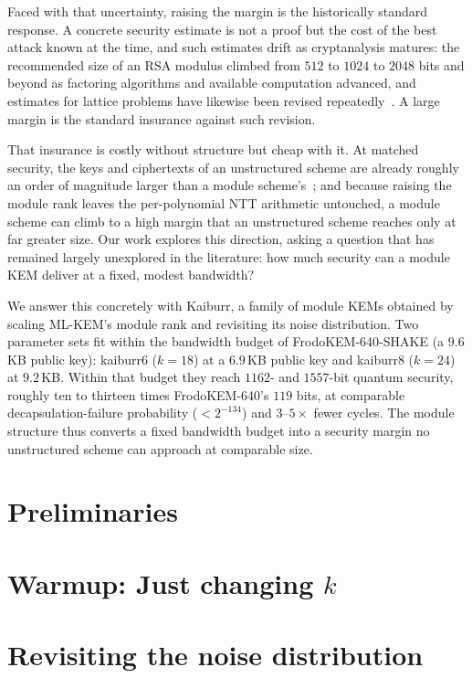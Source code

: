 \documentclass[a4paper,runningheads]{llncs}
\newcommand{\kyberk}{\ensuremath{k}\xspace}
\begin{document}
Faced with that uncertainty, raising the margin is the historically standard response.
A concrete security estimate is not a proof but the cost of the best attack known at the time, and such estimates drift as cryptanalysis matures: the recommended size of an RSA modulus climbed from $512$ to $1024$ to $2048$ bits and beyond as factoring algorithms and available computation advanced, and estimates for lattice problems have likewise been revised repeatedly~\cite{TODO-lattice-estimates}.
A large margin is the standard insurance against such revision.

That insurance is costly without structure but cheap with it.
At matched security, the keys and ciphertexts of an unstructured scheme are already roughly an order of magnitude larger than a module scheme's~\cite{TODO-frodo-ring}; and because raising the module rank leaves the per-polynomial NTT arithmetic untouched, a module scheme can climb to a high margin that an unstructured scheme reaches only at far greater size.
Our work explores this direction, asking a question that has remained largely unexplored in the literature: how much security can a module KEM deliver at a fixed, modest bandwidth?

We answer this concretely with \textsf{Kaiburr}, a family of module KEMs obtained by scaling ML-KEM's module rank and revisiting its noise distribution.
Two parameter sets fit within the bandwidth budget of FrodoKEM-640-SHAKE (a $9.6$\,KB public key): \textsf{kaiburr6} ($k=18$) at a $6.9$\,KB public key and \textsf{kaiburr8} ($k=24$) at $9.2$\,KB.
Within that budget they reach $1162$- and $1557$-bit quantum security, roughly ten to thirteen times FrodoKEM-640's $119$ bits, at comparable decapsulation-failure probability ($<2^{-134}$) and $3$--$5\times$ fewer cycles.
The module structure thus converts a fixed bandwidth budget into a security margin no unstructured scheme can approach at comparable size.



\section{Preliminaries}
\label{sec:preliminaries}

\section{Warmup: Just changing \kyberk}
\label{sec:warmup}

\section{Revisiting the noise distribution}
\label{sec:distribution}
\end{document}
